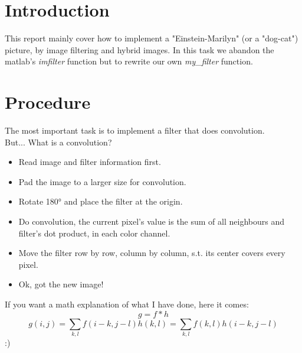 \section*{Introduction}
This report mainly cover how to implement a "Einstein-Marilyn" (or a "dog-cat") picture, by image filtering and hybrid images. In this task we abandon the matlab's \textit{imfilter} function but to rewrite our own \textit{my\_filter} function.


\section*{Procedure}
The most important task is to implement a filter that does convolution. \\But... What is a convolution? 
\begin{itemize}
	\item Read image and filter information first.
	\item Pad the image to a larger size for convolution.
	\item Rotate 180° and place the filter at the origin.
	\item Do convolution, the current pixel's value is the sum of all neighbours and filter's dot product, in each color channel.
	\item Move the filter row by row, column by column, s.t. its center covers every pixel.
	\item Ok, got the new image!
\end{itemize}
If you want a math explanation of what I have done, here it comes:
\begin{equation}
g=f*h
\end{equation} 
\begin{equation}
g(i,j)=\sum_{k,l}f(i-k,j-l)h(k,l)=\sum_{k,l}f(k,l)h(i-k,j-l)
\end{equation}
:)

